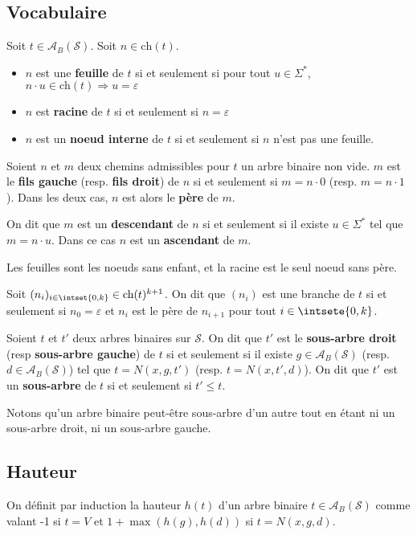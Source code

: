 \documentclass{scrartcl}
\begin{document}
		
		\subsection{Vocabulaire}
			Soit $t \in \mathscr{A}_B(\mathcal{S})$.
			Soit $n \in \text{ch}(t)$.
			\begin{itemize}
				\item $n$ est une \textbf{feuille} de $t$ si et seulement si pour tout $u \in \Sigma^*$, $n\cdot u \in \text{ch}(t) \Rightarrow u=\varepsilon$
				\item $n$ est \textbf{racine} de $t$ si et seulement si $n = \varepsilon$
				\item $n$ est un \textbf{noeud interne} de $t$ si et seulement si $n$ n'est pas une feuille.
			\end{itemize}
			
			
			Soient $n$ et $m$ deux chemins admissibles pour $t$ un arbre binaire non vide.
			$m$ est le \textbf{fils gauche} (resp. \textbf{fils droit}) de $n$ si et seulement si $m = n\cdot 0$ (resp. $m = n \cdot 1$).
			Dans les deux cas, $n$ est alors le \textbf{père} de $m$.

			On dit que $m$ est un \textbf{descendant} de $n$ si et seulement si il existe $u \in \Sigma^*$ tel que $m = n \cdot u$.
			Dans ce cas $n$ est un \textbf{ascendant} de $m$.

			\rem Les feuilles sont les noeuds sans enfant, et la racine est le seul noeud sans père.

			Soit $(n_i)_{i \in \intset{0,k}} \in \text{ch}(t)^{k+1}$.
			On dit que $(n_i)$ est une branche de $t$ si et seulement si $n_0 = \varepsilon$ et $n_i$ est le père de $n_{i+1}$ pour tout $i \in \intsete{0,k}$.
			
			Soient $t$ et $t'$ deux arbres binaires sur $\mathcal{S}$. On dit que $t'$ est le \textbf{sous-arbre droit} (resp \textbf{sous-arbre gauche}) de $t$
			si et seulement si il existe $g \in \mathscr{A}_B(\mathcal{S})$ (resp. $d \in \mathscr{A}_B(\mathcal{S})$) tel que $t = N(x,g,t')$ (resp. $t = N(x,t',d)$).
			On dit que $t'$ est un \textbf{sous-arbre} de $t$ si et seulement si $t' \leq t$.

			\rem Notons qu'un arbre binaire peut-être sous-arbre d'un autre tout en étant ni un sous-arbre droit, ni un sous-arbre gauche.

		\subsection{Hauteur}
			On définit par induction la hauteur $h(t)$ d'un arbre binaire $t \in \mathscr{A}_B(\mathcal{S})$ comme valant 
			-1 si $t = V$ et $1 + \max(h(g),h(d))$ si $t = N(x,g,d)$.
\end{document}

